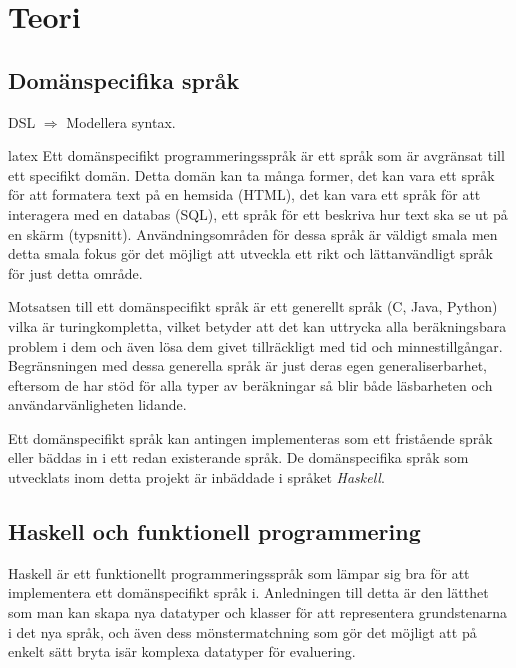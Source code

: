 
\chapter{Teori}

\section{Domänspecifika språk}
\begin{binge}
DSL $\Rightarrow$ Modellera syntax.
\end{binge}
\begin{draft}
  \Gls{latex}
  Ett domänspecifikt programmeringsspråk är ett språk som är avgränsat till ett
  specifikt domän. Detta domän kan ta många former, det kan vara ett språk för
  att formatera text på en hemsida (HTML), det kan vara ett språk för att
  interagera med en databas (SQL), ett språk för ett beskriva hur text ska se
  ut på en skärm  (typsnitt). Användningsområden för dessa språk är väldigt
  smala men detta smala fokus gör det möjligt att utveckla ett rikt och
  lättanvändligt språk för just detta område. 

  Motsatsen till ett domänspecifikt språk är ett generellt språk (C, Java,
  Python) vilka är turingkompletta, vilket betyder att det kan uttrycka alla
  beräkningsbara problem i dem och även lösa dem givet tillräckligt med tid och
   minnestillgångar. Begränsningen med dessa generella språk är
  just deras egen generaliserbarhet, eftersom de har stöd för alla typer av
  beräkningar så blir både läsbarheten och användarvänligheten lidande.
  
  Ett domänspecifikt språk kan antingen implementeras som ett fristående språk
  eller bäddas in i ett redan existerande språk. De domänspecifika språk som
  utvecklats inom detta projekt är inbäddade i språket \textit{Haskell}.
\end{draft}

\section{Haskell och funktionell programmering}

\begin{draft}
  Haskell är ett funktionellt programmeringsspråk som lämpar sig bra för att
  implementera ett domänspecifikt språk i. Anledningen till detta är den lätthet
  som man kan skapa nya datatyper och klasser för att representera grundstenarna
  i det nya språk, och även dess mönstermatchning som gör det möjligt att på
  enkelt sätt bryta isär komplexa datatyper för evaluering.
\end{draft}

